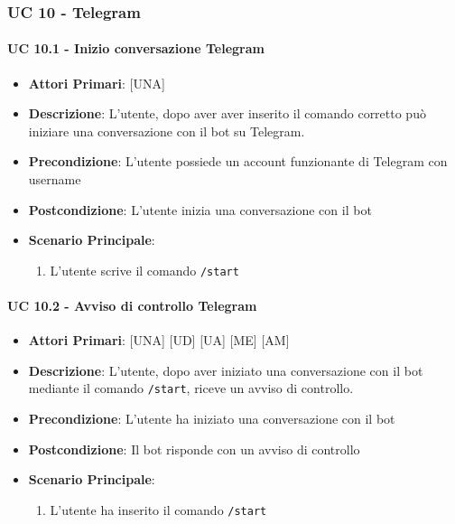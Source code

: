 		\subsubsection{UC 10 - Telegram}

			\paragraph{UC 10.1 - Inizio conversazione Telegram }
			\begin{itemize}
				\item \textbf{Attori Primari}: [UNA]
				\item \textbf{Descrizione}: L'utente, dopo aver aver inserito il comando corretto può iniziare una conversazione con il bot su Telegram.
				\item \textbf{Precondizione}: L'utente possiede un account funzionante di Telegram con username 
				\item \textbf{Postcondizione}: L'utente inizia una conversazione con il bot
				\item \textbf{Scenario Principale}:
				\begin{enumerate}
					\item{L'utente scrive il comando \verb!/start! }
				\end{enumerate}	
			\end{itemize}

			\paragraph{UC 10.2 - Avviso di controllo Telegram}
			\begin{itemize}
				\item \textbf{Attori Primari}: [UNA] [UD] [UA] [ME] [AM]
				\item \textbf{Descrizione}: L'utente, dopo aver iniziato una conversazione con il bot mediante il comando \verb!/start!, riceve un avviso di controllo. 
				\item \textbf{Precondizione}: L'utente ha iniziato una conversazione con il bot
				\item \textbf{Postcondizione}: Il bot risponde con un avviso di controllo
				\item \textbf{Scenario Principale}:
				\begin{enumerate}
					\item{L'utente ha inserito il comando \verb!/start!}
				\end{enumerate}	
			\end{itemize}	

